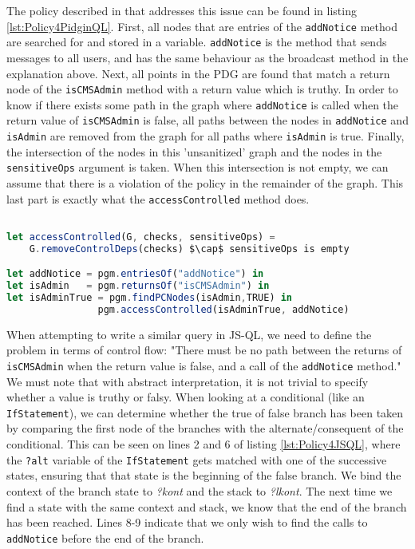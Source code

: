 The policy described in \cite{PidginQLTechReport} that addresses this issue can be found in listing \ref{lst:Policy4PidginQL}. First, all nodes that are entries of the \texttt{addNotice} method are searched for and stored in a variable. \texttt{addNotice} is the method that sends messages to all users, and has the same behaviour as the broadcast method in the explanation above. Next, all points in the PDG are found that match a return node of the \texttt{isCMSAdmin} method with a return value which is truthy. In order to know if there exists some path in the graph where \texttt{addNotice} is called when the return value of \texttt{isCMSAdmin} is false, all paths between the nodes in \texttt{addNotice} and \texttt{isAdmin} are removed from the graph for all paths where \texttt{isAdmin} is true. Finally, the intersection of the nodes in this 'unsanitized' graph and the nodes in the \texttt{sensitiveOps} argument is taken. When this intersection is not empty, we can assume that there is a violation of the policy in the remainder of the graph. This last part is exactly what the \texttt{accessControlled} method does.

\begin{lstlisting}[label={lst:Policy4PidginQL},language=JavaScript,caption=Policy 4 in PidginQL,mathescape=true]  % float=t?

let accessControlled(G, checks, sensitiveOps) = 
    G.removeControlDeps(checks) $\cap$ sensitiveOps is empty

let addNotice = pgm.entriesOf("addNotice") in
let isAdmin   = pgm.returnsOf("isCMSAdmin") in 
let isAdminTrue = pgm.findPCNodes(isAdmin,TRUE) in
                pgm.accessControlled(isAdminTrue, addNotice)
\end{lstlisting}

When attempting to write a similar query in JS-QL, we need to define the problem in terms of control flow: "There must be no path between the returns of \texttt{isCMSAdmin} when the return value is false, and a call of the \texttt{addNotice} method." We must note that with abstract interpretation, it is not trivial to specify whether a value is truthy or falsy. When looking at a conditional (like an \texttt{IfStatement}), we can determine whether the true of false branch has been taken by comparing the first node of the branches with the alternate/consequent of the conditional. This can be seen on lines 2 and 6 of listing \ref{lst:Policy4JSQL}, where the \texttt{?alt} variable of the \texttt{IfStatement} gets matched with one of the successive states, ensuring that that state is the beginning of the false branch. We bind the context of the branch state to \textit{?kont} and the stack to \textit{?lkont}. The next time we find a state with the same context and stack, we know that the end of the branch has been reached. Lines 8-9 indicate that we only wish to find the calls to \texttt{addNotice} before the end of the branch.

